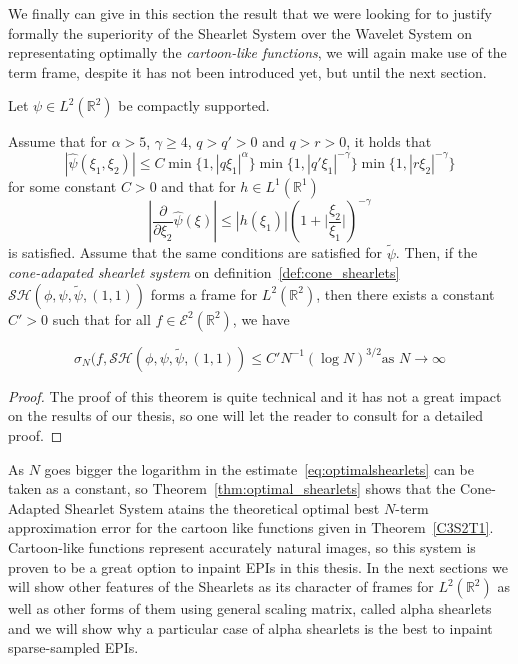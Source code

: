 We finally can give in this section the result that we were looking for to justify formally the superiority of the Shearlet System over the Wavelet System on representating optimally the \textit{cartoon-like functions}, we will again make use of the term frame, despite it has not been introduced yet, but until the next section.

\begin{thm}
\label{thm:optimal_shearlets}
Let $\psi\in L^2(\mathbb{R}^2)$ be compactly supported.

Assume that  for $\alpha>5$, $\gamma\geq 4$, $q>q'>0$ and $q>r>0$, it holds that
\begin{equation}
\label{eq:boundframe}
|\hat{\psi}(\xi_1,\xi_2)|\leq C \min\{1,|q\xi_1|^{\alpha}\}\min\{1,|q'\xi_1|^{-\gamma}\}\min\{1,|r\xi_2|^{-\gamma}\}
\end{equation}
for some constant $C>0$ and that for $h\in L^1(\mathbb{R}^1)$ 
$$
|\frac{\partial}{\partial\xi_2}\hat{\psi}(\xi)|\leq |h(\xi_1)|\left(1+\big| \frac{\xi_2}{\xi_1}\big|\right)^{-\gamma}
$$
is satisfied. Assume that the same conditions are satisfied for $\tilde{\psi}$. Then, if the \textit{cone-adapated shearlet system} on definition~\ref{def:cone_shearlets} $\mathcal{SH}(\phi,\psi,\tilde{\psi},(1,1))$ forms a frame for $L^2(\mathbb{R}^2)$, then there exists a constant $C'>0$ such that for all $f\in\mathcal{E}^2(\mathbb{R}^2)$, we have 

\begin{equation}
\label{eq:optimalshearlets}
\sigma_N(f,\mathcal{SH}(\phi,\psi,\tilde{\psi},(1,1))\leq C'N^{-1}(\log N)^{3/2} \text{as  } N\longrightarrow\infty
\end{equation}
\end{thm}
\begin{proof}
The proof of this theorem is quite technical and it has not a great impact on the results of our thesis, so one will let the reader to consult \cite{FirstShearlets} for a detailed proof. 
\end{proof}

As $N$ goes bigger the logarithm in the estimate~\ref{eq:optimalshearlets} can be taken as a constant, so Theorem~\ref{thm:optimal_shearlets} shows that the Cone-Adapted Shearlet System atains the theoretical optimal best $N$-term approximation error for the cartoon like functions given in Theorem~\ref{C3S2T1}. Cartoon-like functions represent accurately natural images, so this system is proven to be a great option to inpaint EPIs in this thesis. In the next sections we will show other features of the Shearlets as its character of frames for $L^2(\mathbb{R}^2)$ as well as other forms of them using general scaling matrix, called alpha shearlets and we will show why a particular case of alpha shearlets is the best to inpaint sparse-sampled EPIs.

